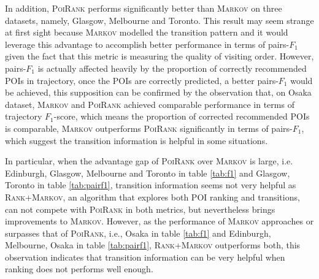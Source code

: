 In addition, \textsc{PoiRank} performs significantly better than \textsc{Markov} on three datasets, namely,
Glasgow, Melbourne and Toronto.
%
This result may seem strange at first sight because \textsc{Markov} modelled the transition pattern and it would leverage
this advantage to accomplish better performance in terms of pairs-$F_1$ given the fact that this metric is measuring the quality
of visiting order.
However, pairs-$F_1$ is actually affected heavily by the proportion of correctly recommended POIs in trajectory,
once the POIs are correctly predicted, a better pairs-$F_1$ would be achieved,
this supposition can be confirmed by the observation that, on Osaka dataset, \textsc{Markov} and \textsc{PoiRank} achieved
comparable performance in terms of trajectory $F_1$-score, which means the proportion of corrected recommended POIs is comparable,
\textsc{Markov} outperforms \textsc{PoiRank} significantly in terms of pairs-$F_1$,
which suggest the transition information is helpful in some situations.

In particular, when the advantage gap of \textsc{PoiRank} over \textsc{Markov} is large,
i.e. Edinburgh, Glasgow, Melbourne and Toronto in table \ref{tab:f1} and Glasgow, Toronto in table \ref{tab:pairf1},
transition information seems not very helpful as \textsc{Rank+Markov}, an algorithm that explores both POI ranking and transitions,
can not compete with \textsc{PoiRank} in both metrics, but nevertheless brings improvements to \textsc{Markov}.
However, as the performance of \textsc{Markov} approaches or surpasses that of \textsc{PoiRank},
i.e., Osaka in table \ref{tab:f1} and Edinburgh, Melbourne, Osaka in table \ref{tab:pairf1},
\textsc{Rank+Markov} outperforms both, this observation indicates that transition information can be very helpful when
ranking does not performs well enough.

